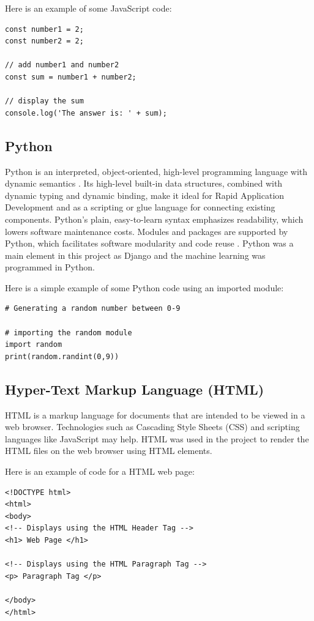 Here is an example of some JavaScript code:
\begin{verbatim}
const number1 = 2;
const number2 = 2;

// add number1 and number2
const sum = number1 + number2;

// display the sum
console.log('The answer is: ' + sum);
\end{verbatim}

\subsection{Python}
Python is an interpreted, object-oriented, high-level programming language with dynamic semantics \cite{Python}. Its high-level built-in data structures, combined with dynamic typing and dynamic binding, make it ideal for Rapid Application Development and as a scripting or glue language for connecting existing components. Python's plain, easy-to-learn syntax emphasizes readability, which lowers software maintenance costs. Modules and packages are supported by Python, which facilitates software modularity and code reuse \cite{Python}. Python was a main element in this project as Django and the machine learning was programmed in Python. 

Here is a simple example of some Python code using an imported module:

\begin{verbatim}
# Generating a random number between 0-9

# importing the random module
import random
print(random.randint(0,9))
\end{verbatim}

\subsection{Hyper-Text Markup Language (HTML)}
HTML is a markup language for documents that are intended to be viewed in a web browser. Technologies such as Cascading Style Sheets (CSS) and scripting languages like JavaScript may help. HTML was used in the project to render the HTML files on the web browser using HTML elements.

Here is an example of code for a HTML web page:

\begin{verbatim}
<!DOCTYPE html>
<html>
<body>
<!-- Displays using the HTML Header Tag -->
<h1> Web Page </h1>

<!-- Displays using the HTML Paragraph Tag -->
<p> Paragraph Tag </p>

</body>
</html>
\end{verbatim}

